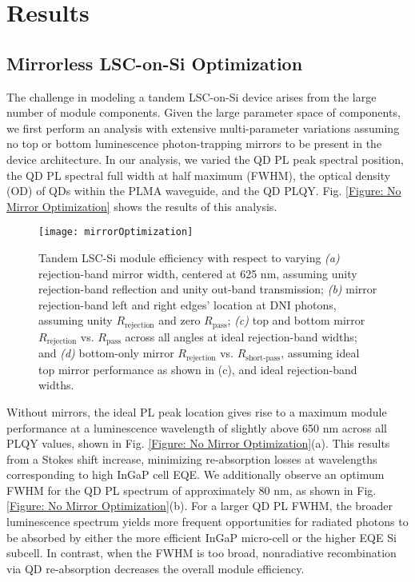 \documentclass[conference]{./pvsctran}
\begin{document}
		\section*{Results}
		
		\subsection*{Mirrorless LSC-on-Si Optimization}
		
		The challenge in modeling a tandem LSC-on-Si device arises from the large number of module components. Given the large parameter space of components, we first perform an analysis with extensive multi-parameter variations assuming no top or bottom luminescence photon-trapping mirrors to be present in the device architecture. In our analysis, we varied the QD PL peak spectral position, the QD PL spectral full width at half maximum (FWHM), the optical density (OD) of QDs within the PLMA waveguide, and the QD PLQY. Fig. \ref{Figure: No Mirror Optimization} shows the results of this analysis. 
		
		\begin{figure*}[t]
			\centering
			\texttt{[image: mirrorOptimization]}
			\caption{Tandem LSC-Si module efficiency with respect to varying \textit{(a)} rejection-band mirror width, centered at 625 nm, assuming unity rejection-band reflection and unity out-band transmission; \textit{(b)} mirror rejection-band left and right edges' location at DNI photons, assuming unity $R_\text{rejection}$ and zero $R_\text{pass}$; \textit{(c)} top and bottom mirror $R_\text{rejection}$ vs. $R_\text{pass}$ across all angles at ideal rejection-band widths; and \textit{(d)} bottom-only mirror $R_\text{rejection}$ vs. $R_\text{short-pass}$, assuming ideal top mirror performance as shown in (c), and ideal rejection-band widths.}
			\label{Figure: Mirror Optimization}
		\end{figure*}
		
		Without mirrors, the ideal PL peak location gives rise to a maximum module performance at a luminescence wavelength of slightly above 650 nm across all PLQY values, shown in Fig. \ref{Figure: No Mirror Optimization}(a). This results from a Stokes shift increase, minimizing re-absorption losses at wavelengths corresponding to high InGaP cell EQE. We additionally observe an optimum FWHM for the QD PL spectrum of approximately 80 nm, as shown in Fig. \ref{Figure: No Mirror Optimization}(b). For a larger QD PL FWHM, the broader luminescence spectrum yields more frequent opportunities for radiated photons to be absorbed by either the more efficient InGaP micro-cell or the higher EQE Si subcell. In contrast, when the FWHM is too broad, nonradiative recombination via QD re-absorption decreases the overall module efficiency. 
		
\end{document}
